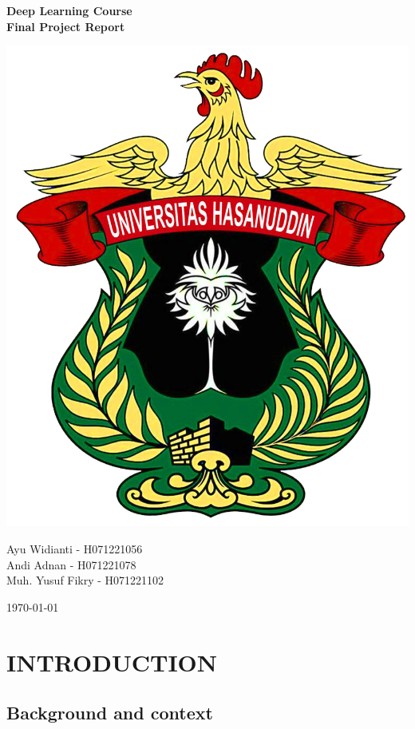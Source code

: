 \documentclass[12pt,a4paper]{article}
\begin{document}
\begin{titlepage}
    \centering
    {\Large\textbf{Deep Learning Course \\ Final Project Report}\par} %
    \vspace{2cm} %
    
    \includegraphics[width=0.5\linewidth]{Image/Logo-Resmi-Unhas.png}\par
    \vspace{2cm} %
    
    {\large
    Ayu Widianti - H071221056\\
    Andi Adnan - H071221078 \\
    Muh. Yusuf Fikry - H071221102\par}
    
    \vspace{1cm} %
    {\large\today\par} %
\end{titlepage}

\normalsize  %

\tableofcontents
\newpage

\section{INTRODUCTION}
\subsection{Background and context}
\end{document}
